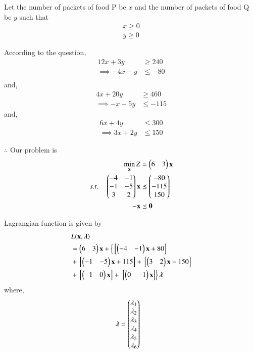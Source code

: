 \documentclass[journal,12pt,twocolumn]{IEEEtran}
\begin{document}
Let the number of packets of food P be $x$ and the number of packets of food Q be $y$  such that 
\begin{align}
    x \geq 0 \\
    y \geq 0 
\end{align}

According to the question,
\begin{align}
    12x+3y &\geq 240 \\
    \implies -4x-y &\leq -80 \\
\end{align}
and,
\begin{align}
    4x+20y &\geq 460 \\
    \implies -x-5y &\leq -115 
\end{align}
and,
\begin{align}
     6x+4y &\leq 300 \\
    \implies 3x+2y &\leq 150 
\end{align}

$\therefore$ Our problem is
\begin{align}
        \min_{\mathbf{x}} Z &= \begin{pmatrix}6 & 3\end{pmatrix}\mathbf{x}\\
        s.t. \quad 
        \begin{pmatrix}-4 & -1 \\ -1 & -5 \\ 3 & 2 \end{pmatrix}\mathbf{x} &\preceq \begin{pmatrix}-80\\-115\\150\end{pmatrix} \\
        \mathbf{-x} &\preceq \mathbf{0}
\end{align}

Lagrangian function is given by
\begin{equation}
\begin{aligned}
    &L(\mathbf{x},\boldsymbol{\lambda}) \\ &= \begin{pmatrix}6 & 3\end{pmatrix}\mathbf{x}+\left\{{}\left[\begin{pmatrix}-4 & -1\end{pmatrix}\mathbf{x}+80\right]\right. \\ &+ {}\left[\begin{pmatrix}-1 & -5\end{pmatrix}\mathbf{x}+115\right] +{}\left[\begin{pmatrix}3 & 2\end{pmatrix}\mathbf{x}-150\right] \\ &+ {}\left[\begin{pmatrix}-1 & 0\end{pmatrix}\mathbf{x}\right] +\left.{}\left[\begin{pmatrix}0 & -1\end{pmatrix}\mathbf{x}\right]\right\}\boldsymbol{\lambda}
\end{aligned}
\end{equation}
where,
\begin{align}
    \boldsymbol{\lambda} &= \begin{pmatrix}\lambda_1 \\ \lambda_2 \\ \lambda_3 \\ \lambda_4 \\ \lambda_5 \\ \lambda_6\end{pmatrix}
\end{align}
\end{document}
